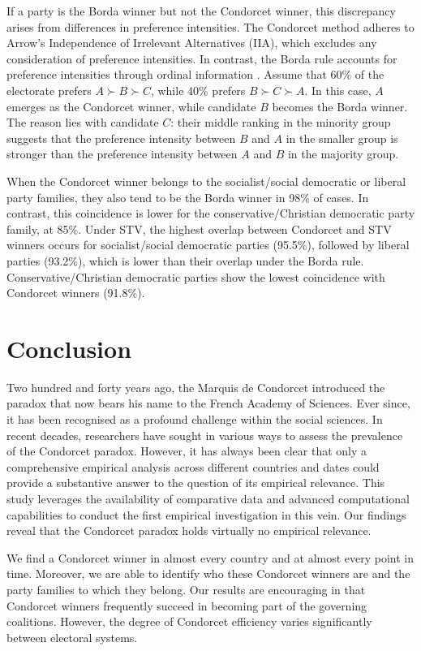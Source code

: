 \documentclass[12pt]{scrartcl}
\begin{document}
If a party is the Borda winner but not the Condorcet winner, this discrepancy arises from differences in preference intensities. The Condorcet method adheres to Arrow's Independence of Irrelevant Alternatives (IIA), which excludes any consideration of preference intensities. In contrast, the Borda rule accounts for preference intensities through ordinal information \citep{Maskin2024}. Assume that 60\% of the electorate prefers $A \succ B \succ C$, while 40\% prefers $B \succ C \succ A$. In this case, $A$ emerges as the Condorcet winner, while candidate $B$ becomes the Borda winner. The reason lies with candidate $C$: their middle ranking in the minority group suggests that the preference intensity between $B$ and $A$ in the smaller group is stronger than the preference intensity between $A$ and $B$ in the majority group.

When the Condorcet winner belongs to the socialist/social democratic or liberal party families, they also tend to be the Borda winner in 98\% of cases. In contrast, this coincidence is lower for the conservative/Christian democratic party family, at 85\%. Under STV, the highest overlap between Condorcet and STV winners occurs for socialist/social democratic parties (95.5\%), followed by liberal parties (93.2\%), which is lower than their overlap under the Borda rule. Conservative/Christian democratic parties show the lowest coincidence with Condorcet winners (91.8\%).

\section{Conclusion}
Two hundred and forty years ago, the Marquis de Condorcet introduced the paradox that now bears his name to the French Academy of Sciences. Ever since, it has been recognised as a profound challenge within the social sciences. In recent decades, researchers have sought in various ways to assess the prevalence of the Condorcet paradox. However, it has always been clear that only a comprehensive empirical analysis across different countries and dates could provide a substantive answer to the question of its empirical relevance. This study leverages the availability of comparative data and advanced computational capabilities to conduct the first empirical investigation in this vein. Our findings reveal that the Condorcet paradox holds virtually no empirical relevance.

We find a Condorcet winner in almost every country and at almost every point in time. Moreover, we are able to identify who these Condorcet winners are and the party families to which they belong. Our results are encouraging in that Condorcet winners frequently succeed in becoming part of the governing coalitions. However, the degree of Condorcet efficiency varies significantly between electoral systems.
\end{document}
